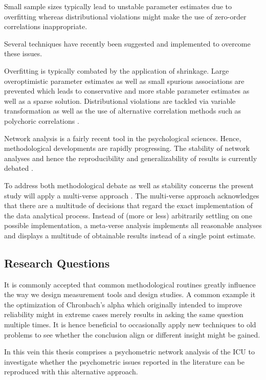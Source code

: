 Small sample sizes typically lead to unstable parameter estimates due to overfitting whereas distributional violations might make the use of zero-order correlations inappropriate.

Several techniques have recently been suggested and implemented to overcome these issues. 

Overfitting is typically combated by the application of shrinkage. 
Large overoptimistic parameter estimates as well as small spurious associations are prevented which leads to conservative and more stable parameter estimates as well as a sparse solution. 
Distributional violations are tackled via variable transformation as well as the use of alternative correlation methods such as polychoric correlations \parencite{epskamp_tutorial_2018}. 

Network analysis is a fairly recent tool in the psychological sciences.
Hence, methodological developments are rapidly progressing.
The stability of network analyses and hence the reproducibility and generalizability of results is currently debated \parencite{forbes_evidence_2017}.

To address both methodological debate as well as stability concerns the present study will apply a multi-verse approach \parencite{steegen_increasing_2016}. The multi-verse approach acknowledges that there are a multitude of decisions that regard the exact implementation of the data analytical process.
Instead of (more or less) arbitrarily settling on one possible implementation, a meta-verse analysis implements all reasonable analyses and displays a multitude of obtainable results instead of a single point estimate.


\subsection{Research Questions}
It is commonly accepted that common methodological routines greatly influence the way we design measurement tools and design studies.
A common example it the optimization of Chronbach's alpha which originally intended to improve reliability might in extreme cases merely results in asking the same question multiple times.
It is hence beneficial to occasionally apply new techniques to old problems to see whether the conclusion align or different insight might be gained.

In this vein this thesis comprises a psychometric network analysis of the ICU to investigate whether the psychometric issues reported in the literature can be reproduced with this alternative approach.


